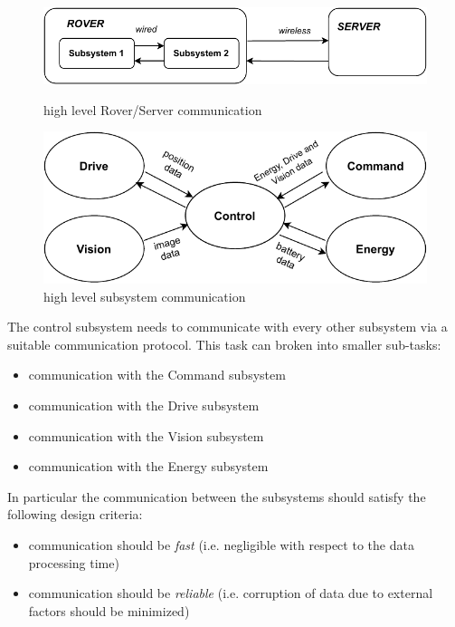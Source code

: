 \documentclass[10pt,twoside]{article}
\begin{document}
\begin{figure}[hbt!]
  \begin{minipage}[b]{0.44\textwidth}
    \centering
    \includegraphics[scale = 0.73]{Server_to_rover_v2.pdf}
    \caption{high level Rover/Server communication}
    \label{fig:server_to_rover}
  \end{minipage}
  \hfill
  \begin{minipage}[b]{0.44\textwidth}
    \includegraphics[scale = 0.7]{Finial_Comms_Highlevel.pdf}
    \caption{high level subsystem communication}
    \label{fig:subsystem_communication}
  \end{minipage}
\end{figure}

The control subsystem needs to communicate with every other subsystem via a suitable communication protocol. 
This task can broken into smaller sub-tasks:
\begin{itemize}
    \itemsep-0.2em
    \item communication with the Command subsystem
    \item communication with the Drive subsystem
    \item communication with the Vision subsystem
    \item communication with the Energy subsystem
\end{itemize}
In particular the communication between the subsystems should satisfy the following design criteria:
\begin{itemize}
    \item communication should be \emph{fast} (i.e. negligible with respect to the data processing time)
    \item communication should be \emph{reliable} (i.e. corruption of data due to external factors should be minimized)
\end{itemize}
\end{document}
